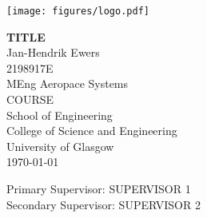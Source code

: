 \begin{titlepage}
\begin{figure*}
    \centering
    \texttt{[image: figures/logo.pdf]}   
\end{figure*}
\hspace*{\fill}

\centering
\vspace*{2cm}
{ \huge \bfseries TITLE}\\[2cm]
 
Jan-Hendrik Ewers\\
2198917E\\
MEng Aeropace Systems\\
COURSE\\[1cm]

School of Engineering\\
College of Science and Engineering\\
University of Glasgow\\[2cm]

{\large \today}

\vspace*{2cm}
Primary Supervisor: SUPERVISOR 1 \\
Secondary Supervisor: SUPERVISOR 2 
\end{titlepage}
